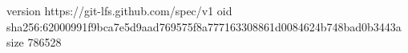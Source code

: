 version https://git-lfs.github.com/spec/v1
oid sha256:62000991f9bca7e5d9aad769575f8a777163308861d0084624b748bad0b3443a
size 786528
